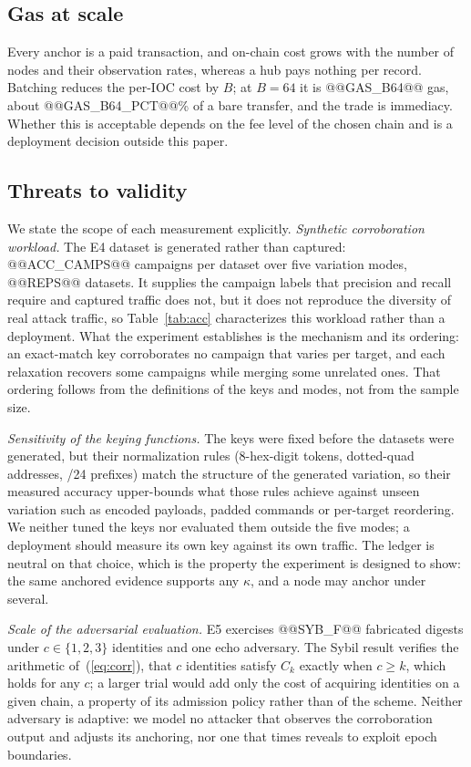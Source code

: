 \documentclass[conference]{IEEEtran}
\begin{document}
\subsection{Gas at scale}
Every anchor is a paid transaction, and on-chain cost grows with the number of nodes and their observation rates, whereas a hub pays nothing per record. Batching reduces the per-IOC cost by $B$; at $B=64$ it is @@GAS_B64@@ gas, about @@GAS_B64_PCT@@\% of a bare transfer, and the trade is immediacy. Whether this is acceptable depends on the fee level of the chosen chain and is a deployment decision outside this paper.

\subsection{Threats to validity}
\label{sec:validity}
We state the scope of each measurement explicitly.
\emph{Synthetic corroboration workload.} The E4 dataset is generated rather than captured: @@ACC_CAMPS@@ campaigns per dataset over five variation modes, @@REPS@@ datasets. It supplies the campaign labels that precision and recall require and captured traffic does not, but it does not reproduce the diversity of real attack traffic, so Table~\ref{tab:acc} characterizes this workload rather than a deployment. What the experiment establishes is the mechanism and its ordering: an exact-match key corroborates no campaign that varies per target, and each relaxation recovers some campaigns while merging some unrelated ones. That ordering follows from the definitions of the keys and modes, not from the sample size.

\emph{Sensitivity of the keying functions.} The keys were fixed before the datasets were generated, but their normalization rules (8-hex-digit tokens, dotted-quad addresses, /24 prefixes) match the structure of the generated variation, so their measured accuracy upper-bounds what those rules achieve against unseen variation such as encoded payloads, padded commands or per-target reordering. We neither tuned the keys nor evaluated them outside the five modes; a deployment should measure its own key against its own traffic. The ledger is neutral on that choice, which is the property the experiment is designed to show: the same anchored evidence supports any $\kappa$, and a node may anchor under several.

\emph{Scale of the adversarial evaluation.} E5 exercises @@SYB_F@@ fabricated digests under $c\in\{1,2,3\}$ identities and one echo adversary. The Sybil result verifies the arithmetic of~(\ref{eq:corr}), that $c$ identities satisfy $C_k$ exactly when $c\ge k$, which holds for any $c$; a larger trial would add only the cost of acquiring identities on a given chain, a property of its admission policy rather than of the scheme. Neither adversary is adaptive: we model no attacker that observes the corroboration output and adjusts its anchoring, nor one that times reveals to exploit epoch boundaries.
\end{document}
